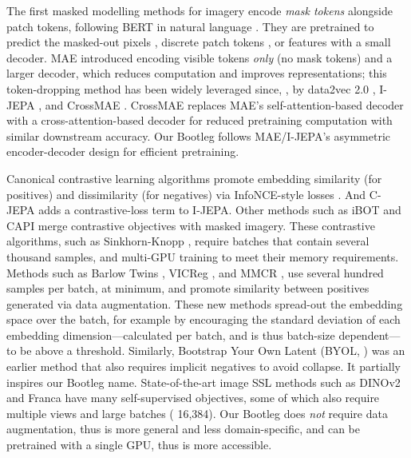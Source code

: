 The first masked modelling methods for imagery encode \emph{mask tokens} alongside patch tokens, following BERT in natural language \citep{devlin-etal-2019-bert}.
They are pretrained to predict the masked-out pixels \citep{xie2022simmim, dosovitskiy2021vit}, discrete patch tokens \citep{bao2021beit, dong2023peco}, or features \citep{zhou2022image, wei2022masked} with a small decoder.
MAE \citep{he2022masked} introduced encoding visible tokens \emph{only} (no mask tokens) and a larger decoder, which reduces computation and improves representations; this token-dropping method has been widely leveraged since, \eg{}, by data2vec 2.0 \citep{baevski2023data2vec2}, I-JEPA \citep{assran2023ijepa}, and CrossMAE \citep{fu2025crossmae}.
CrossMAE replaces MAE's self-attention-based decoder with a cross-attention-based decoder for reduced pretraining computation with similar downstream accuracy.
Our Bootleg follows MAE/I-JEPA's asymmetric encoder-decoder design for efficient pretraining.

Canonical contrastive learning algorithms \citep{chen2020improved, chen2021empirical, chen2020simple} promote embedding similarity (for positives) and dissimilarity (for negatives) via InfoNCE-style losses \citep{oord2018representation}.
And C-JEPA \citep{mo2024connecting} adds a contrastive-loss term to I-JEPA.
Other methods such as iBOT \citep{zhou2022image} and CAPI \citep{darcet2025capi} merge contrastive objectives with masked imagery.
These contrastive algorithms, such as Sinkhorn-Knopp \citep{Caron2020_SwAV}, require batches that contain several thousand samples, and multi-GPU training to meet their memory requirements.
Methods such as Barlow Twins \citep{zbontar2021barlow}, VICReg \citep{bardes2021vicreg}, and MMCR \citep{yerxa2023learning}, use several hundred samples per batch, at minimum, and promote similarity between positives generated via data augmentation.
These new methods spread-out the embedding space over the batch, for example by encouraging the standard deviation of each embedding dimension---calculated per batch, and is thus batch-size dependent---to be above a threshold.
Similarly, Bootstrap Your Own Latent (BYOL, \citep{grill2020bootstrap}) was an earlier method that also requires implicit negatives to avoid collapse.
It partially inspires our Bootleg name.
State-of-the-art image SSL methods such as DINOv2 \citep{oquab2023dinov2} and Franca \citep{venkataramanan2025franca} have many self-supervised objectives, some of which also require multiple views and large batches (\eg{} 16,384).
Our Bootleg does \emph{not} require data augmentation, thus is more general and less domain-specific, and can be pretrained with a single GPU, thus is more accessible.


